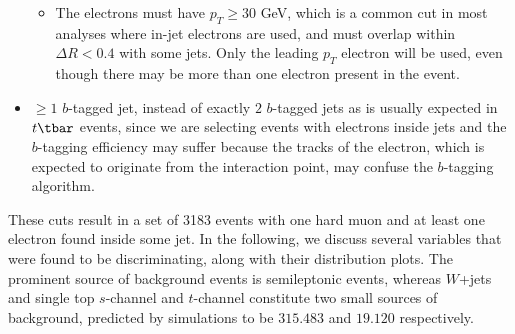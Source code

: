 \begin{itemize}
\begin{itemize}
		      \item The electrons must have $p_T \geq 30$ GeV, which is a common cut in most
		            analyses where in-jet electrons are used, and must overlap within $\Delta R <
			            0.4$ with some jets. Only the leading $p_T$ electron will be used, even though
		            there may be more than one electron present in the event.

	      \end{itemize}

	\item $\geq 1$ $b$-tagged jet, instead of exactly $2$ $b$-tagged jets as is
	      usually expected in $t\tbar$ events, since we are selecting events with
	      electrons inside jets and the $b$-tagging efficiency may suffer because the
	      tracks of the electron, which is expected to originate from the interaction
	      point, may confuse the $b$-tagging algorithm.

\end{itemize}

These cuts result in a set of 3183 events with one hard muon and at least one
electron found inside some jet. In the following, we discuss several variables
that were found to be discriminating, along with their distribution plots. The
prominent source of background events is semileptonic events, whereas $W$+jets
and single top $s$-channel and $t$-channel constitute two small sources of
background, predicted by simulations to be $315.483$ and $19.120$ respectively.

